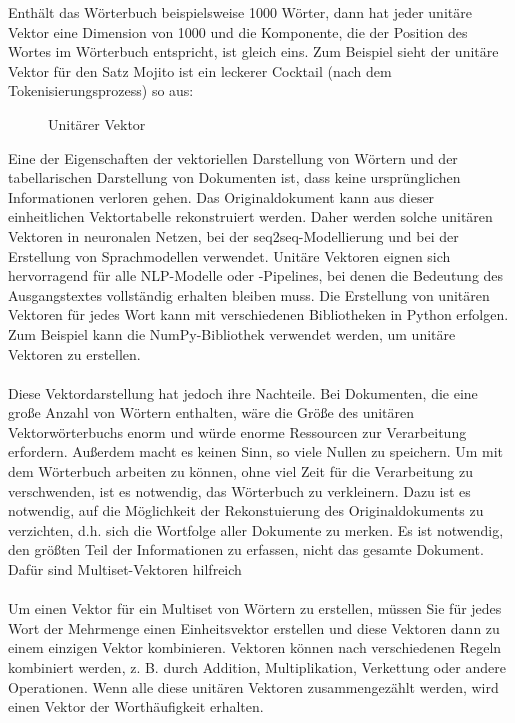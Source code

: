 Enthält das Wörterbuch beispielsweise 1000 Wörter, dann hat jeder unitäre Vektor eine Dimension von 1000 und die Komponente, die der Position des Wortes im Wörterbuch entspricht, ist gleich eins.
Zum Beispiel sieht der unitäre Vektor für den Satz \glqq Mojito ist ein leckerer Cocktail\grqq{} (nach dem Tokenisierungsprozess) so aus:
\begin{figure}[H]
    \centering
    \caption{\label{figure:Unitaere_Vektoe}Unitärer Vektor}
\end{figure}
\noindent
Eine der Eigenschaften der vektoriellen Darstellung von Wörtern und der tabellarischen Darstellung von Dokumenten ist, dass keine ursprünglichen Informationen verloren gehen. 
Das Originaldokument kann aus dieser einheitlichen Vektortabelle rekonstruiert werden. 
Daher werden solche unitären Vektoren in neuronalen Netzen, bei der \ac{seq2seq}-Modellierung und bei der Erstellung von Sprachmodellen verwendet. 
Unitäre Vektoren eignen sich hervorragend für alle \ac{NLP}-Modelle oder -Pipelines, bei denen die Bedeutung des Ausgangstextes vollständig erhalten bleiben muss.
Die Erstellung von unitären Vektoren für jedes Wort kann mit verschiedenen Bibliotheken in Python erfolgen. 
Zum Beispiel kann die NumPy-Bibliothek verwendet werden, um unitäre Vektoren zu erstellen.\\\\
Diese Vektordarstellung hat jedoch ihre Nachteile. 
Bei Dokumenten, die eine große Anzahl von Wörtern enthalten, wäre die Größe des unitären Vektorwörterbuchs enorm und würde enorme Ressourcen zur Verarbeitung erfordern. 
Außerdem macht es keinen Sinn, so viele Nullen zu speichern. 
Um mit dem Wörterbuch arbeiten zu können, ohne viel Zeit für die Verarbeitung zu verschwenden, ist es notwendig, das Wörterbuch zu verkleinern. 
Dazu ist es notwendig, auf die Möglichkeit der Rekonstuierung des Originaldokuments zu verzichten, d.h. sich die Wortfolge aller Dokumente zu merken. 
Es ist notwendig, den größten Teil der Informationen zu erfassen, nicht das gesamte Dokument. Dafür sind Multiset-Vektoren hilfreich\\\\
Um einen Vektor für ein Multiset von Wörtern zu erstellen, müssen Sie für jedes Wort der Mehrmenge einen Einheitsvektor erstellen und diese Vektoren dann zu einem einzigen Vektor kombinieren. 
Vektoren können nach verschiedenen Regeln kombiniert werden, z. B. durch Addition, Multiplikation, Verkettung oder andere Operationen. 
Wenn alle diese unitären Vektoren zusammengezählt werden, wird einen Vektor der Worthäufigkeit erhalten. 
